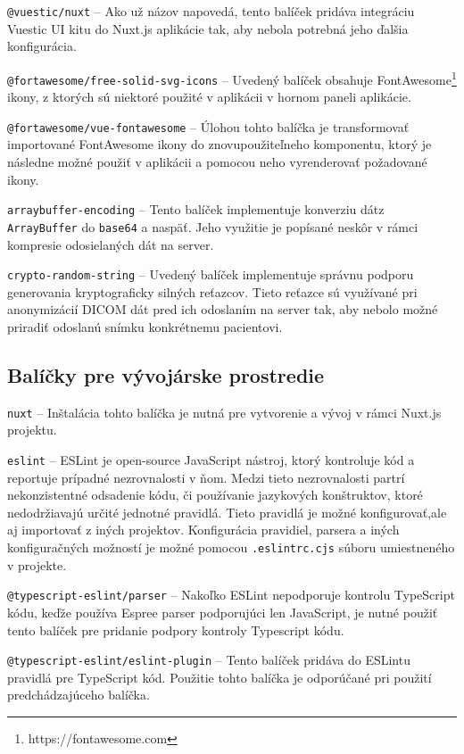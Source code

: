 \texttt{@vuestic/nuxt} -- Ako už názov napovedá, tento balíček pridáva integráciu Vuestic UI kitu do Nuxt.js aplikácie tak, aby nebola potrebná jeho ďalšia konfigurácia.

\texttt{@fortawesome/free-solid-svg-icons} -- Uvedený balíček obsahuje FontAwesome\footnote{https://fontawesome.com} ikony, z ktorých sú niektoré použité v aplikácii v hornom paneli aplikácie.

\texttt{@fortawesome/vue-fontawesome} -- Úlohou tohto balíčka je transformovať importované FontAwesome ikony do znovupoužiteľneho komponentu, ktorý je následne možné použiť v aplikácii a pomocou neho vyrenderovať požadované ikony.

\texttt{arraybuffer-encoding} -- Tento balíček implementuje konverziu dát\newline z \texttt{ArrayBuffer} do \texttt{base64} a naspäť. Jeho využitie je popísané neskôr v rámci kompresie odosielaných dát na server.

\texttt{crypto-random-string} -- Uvedený balíček implementuje správnu podporu generovania kryptograficky silných reťazcov. Tieto reťazce sú využívané pri anonymizácií DICOM dát pred ich odoslaním na server tak, aby nebolo možné priradiť odoslanú snímku konkrétnemu pacientovi.

\subsection {Balíčky pre vývojárske prostredie}
\texttt{nuxt} -- Inštalácia tohto balíčka je nutná pre vytvorenie a vývoj v rámci Nuxt.js projektu.

\texttt{eslint} -- ESLint je open-source JavaScript nástroj, ktorý kontroluje kód a reportuje prípadné nezrovnalosti v ňom. Medzi tieto nezrovnalosti partrí nekonzistentné odsadenie kódu, či používanie jazykových konštruktov, ktoré nedodržiavajú určité jednotné pravidlá. Tieto pravidlá je možné konfigurovať,\newline ale aj importovať z iných projektov. Konfigurácia pravidiel, parsera a iných konfiguračných možností je možné pomocou \texttt{.eslintrc.cjs} súboru umiestneného v projekte.

\texttt{@typescript-eslint/parser} -- Nakoľko ESLint nepodporuje kontrolu TypeScript kódu, keďže používa Espree parser podporujúci len JavaScript, je nutné použiť tento balíček pre pridanie podpory kontroly Typescript kódu. 

\texttt{@typescript-eslint/eslint-plugin} -- Tento balíček pridáva do ESLintu pravidlá pre TypeScript kód. Použitie tohto balíčka je odporúčané pri použití predchádzajúceho balíčka.


